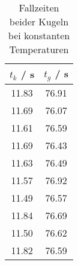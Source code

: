 \begin{table}[!htp]
\centering
\caption{Fallzeiten beider Kugeln bei konstanten Temperaturen}
\label{tab:fallzeit}
\begin{tabular}{c c}
\toprule
{{$t_k$ / s}} & {{$t_g$ / s}} \\
\midrule
11.83 & 76.91 \\
11.69 & 76.07 \\
11.61 & 76.59 \\
11.69 & 76.43 \\
11.63 & 76.49 \\
11.57 & 76.92 \\
11.49 & 76.57 \\
11.84 & 76.69 \\
11.50 & 76.62 \\
11.82 & 76.59 \\
\bottomrule
\end{tabular}
\end{table}